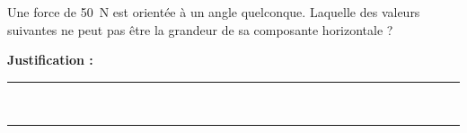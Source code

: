 Une force de \qty{50}{N} est orientée à un angle quelconque. Laquelle des valeurs suivantes ne peut pas être la grandeur de sa composante horizontale ?

\choices

\noindent\textbf{Justification :} \hrulefill \\[2.5ex]
\rule{\linewidth}{0.4pt} \\[2.5ex]
\rule{\linewidth}{0.4pt}
\vfill
